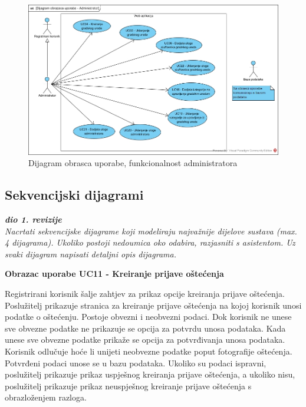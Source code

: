 \begin{figure}[H]
	\includegraphics[scale=0.5]{slike/UC-administrator} %
	\centering
	\caption{Dijagram obrasca uporabe, funkcionalnost administratora}
	\label{fig:DijagramObrascaUporabeAdministrator}
\end{figure}

\subsection{Sekvencijski dijagrami}

\textbf{\textit{dio 1. revizije}}\\

\textit{Nacrtati sekvencijske dijagrame koji modeliraju najvažnije dijelove sustava (max. 4 dijagrama). Ukoliko postoji nedoumica oko odabira, razjasniti s asistentom. Uz svaki dijagram napisati detaljni opis dijagrama.}
\eject


\noindent \textbf{Obrazac uporabe UC11 - Kreiranje prijave oštećenja}

Registrirani korisnik šalje zahtjev za prikaz opcije kreiranja prijave oštećenja. Poslužitelj prikazuje stranica za kreiranje 
prijave oštećenja na kojoj korisnik unosi podatke o oštećenju. Postoje obvezni i neobvezni podaci. Dok korisnik ne unese sve 
obvezne podatke ne prikazuje se opcija za potvrdu unosa podataka. Kada unese sve obvezne podatke prikaže se opcija za potvrđivanja 
unosa podataka. Korisnik odlučuje hoće li unijeti neobvezne podatke poput fotografije oštećenja. Potvrđeni podaci unose se u 
bazu podataka. Ukoliko su podaci ispravni, poslužitelj prikazuje prikaz uspješnog kreiranja prijave oštećenja, a ukoliko nisu, 
poslužitelj prikazuje prikaz neuspješnog kreiranje prijave oštećenja s obrazloženjem razloga.

